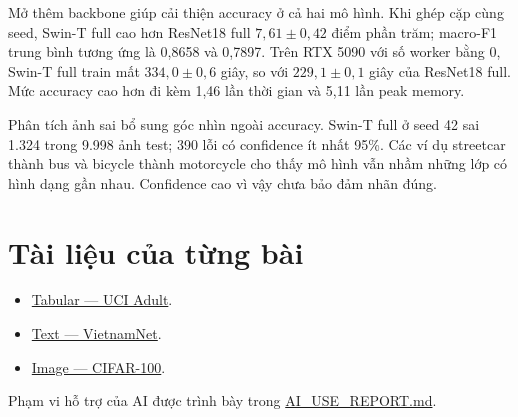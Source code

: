 \documentclass[12pt,a4paper]{report}
\begin{document}
Mở thêm backbone giúp cải thiện accuracy ở cả hai mô hình. Khi ghép cặp cùng seed, Swin-T full cao hơn ResNet18 full $7{,}61\pm0{,}42$ điểm phần trăm; macro-F1 trung bình tương ứng là 0,8658 và 0,7897. Trên RTX 5090 với số worker bằng 0, Swin-T full train mất $334{,}0\pm0{,}6$ giây, so với $229{,}1\pm0{,}1$ giây của ResNet18 full. Mức accuracy cao hơn đi kèm 1,46 lần thời gian và 5,11 lần peak memory.

Phân tích ảnh sai bổ sung góc nhìn ngoài accuracy. Swin-T full ở seed 42 sai 1.324 trong 9.998 ảnh test; 390 lỗi có confidence ít nhất 95\%. Các ví dụ streetcar thành bus và bicycle thành motorcycle cho thấy mô hình vẫn nhầm những lớp có hình dạng gần nhau. Confidence cao vì vậy chưa bảo đảm nhãn đúng.

\section{Tài liệu của từng bài}
\begin{itemize}
\item \href{https://dathuynh1108.github.io/CO5177-PFDAV/assignments/tabular.html}{Tabular — UCI Adult}.
\item \href{https://dathuynh1108.github.io/CO5177-PFDAV/assignments/text.html}{Text — VietnamNet}.
\item \href{https://dathuynh1108.github.io/CO5177-PFDAV/assignments/image.html}{Image — CIFAR-100}.
\end{itemize}

Phạm vi hỗ trợ của AI được trình bày trong \href{https://github.com/dathuynh1108/CO5177-PFDAV/blob/main/AI\_USE\_REPORT.md}{AI\_USE\_REPORT.md}.
\end{document}
